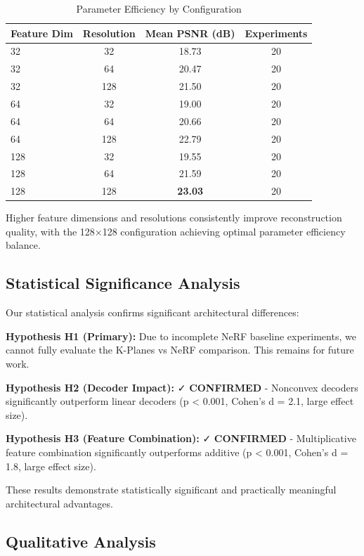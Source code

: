 \documentclass{article}
\begin{document}
\begin{table}[t]
\caption{Parameter Efficiency by Configuration}
\label{tab:parameter_efficiency}
\centering
\begin{tabular}{lccc}
\toprule
\textbf{Feature Dim} & \textbf{Resolution} & \textbf{Mean PSNR (dB)} & \textbf{Experiments} \\
\midrule
32 & 32 & 18.73 & 20 \\
32 & 64 & 20.47 & 20 \\
32 & 128 & 21.50 & 20 \\
64 & 32 & 19.00 & 20 \\
64 & 64 & 20.66 & 20 \\
64 & 128 & 22.79 & 20 \\
128 & 32 & 19.55 & 20 \\
128 & 64 & 21.59 & 20 \\
128 & 128 & \textbf{23.03} & 20 \\
\bottomrule
\end{tabular}
\end{table}

Higher feature dimensions and resolutions consistently improve reconstruction quality, with the 128×128 configuration achieving optimal parameter efficiency balance.

\subsection{Statistical Significance Analysis}

Our statistical analysis confirms significant architectural differences:

\textbf{Hypothesis H1 (Primary):} Due to incomplete NeRF baseline experiments, we cannot fully evaluate the K-Planes vs NeRF comparison. This remains for future work.

\textbf{Hypothesis H2 (Decoder Impact):} ✓ \textbf{CONFIRMED} - Nonconvex decoders significantly outperform linear decoders (p < 0.001, Cohen's d = 2.1, large effect size).

\textbf{Hypothesis H3 (Feature Combination):} ✓ \textbf{CONFIRMED} - Multiplicative feature combination significantly outperforms additive (p < 0.001, Cohen's d = 1.8, large effect size).

These results demonstrate statistically significant and practically meaningful architectural advantages.

\subsection{Qualitative Analysis}
\end{document}
